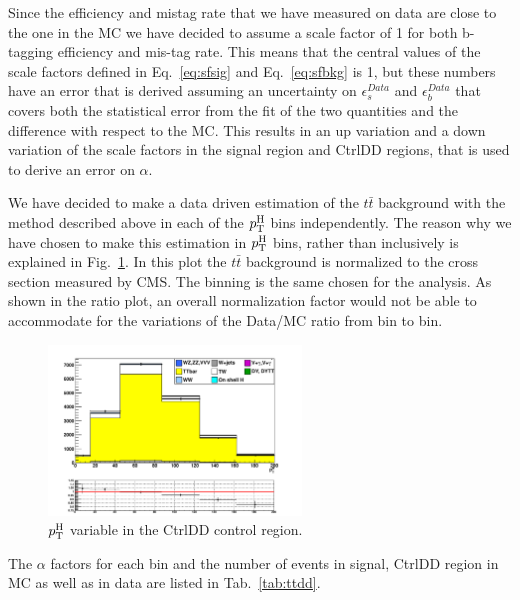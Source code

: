 Since the efficiency and mistag rate that we have measured on data are close to the one in the MC we have decided to assume a scale factor of 1 for both b-tagging efficiency and mis-tag rate. This means that the central values of the scale factors defined in Eq.~\ref{eq:sfsig} and Eq.~\ref{eq:sfbkg} is 1, but these numbers have an error that is derived assuming an uncertainty on $\epsilon_{s}^{Data}$ and $\epsilon_{b}^{Data}$ that covers both the statistical error from the fit of the two quantities and the difference with respect to the MC.
This results in an up variation and a down variation of the scale factors in the signal region and CtrlDD regions, that is used to derive an error on $\alpha$.

We have decided to make a data driven estimation of the $t\bar{t}$ background with the method described above in each of the $p_\mathrm{T}^\mathrm{H}$ bins independently. The reason why we have chosen to make this estimation in $p_\mathrm{T}^\mathrm{H}$ bins, rather than inclusively is explained in Fig.~\ref{fig:ttpth}. In this plot the $t\bar{t}$ background is normalized to the cross section measured by CMS. The binning is the same chosen for the analysis. As shown in the ratio plot, an overall normalization factor would not be able to accommodate for the variations of the Data/MC ratio from bin to bin.
\begin{figure}[b]
\centering
\includegraphics[width=0.6\textwidth]{images/ttpth.pdf}
\caption{$p_\mathrm{T}^\mathrm{H}$ variable in the CtrlDD control region.\label{fig:ttpth}}
\end{figure}

The $\alpha$ factors for each bin and the number of events in signal, CtrlDD region in MC as well as in data are listed in Tab.~\ref{tab:ttdd}.

